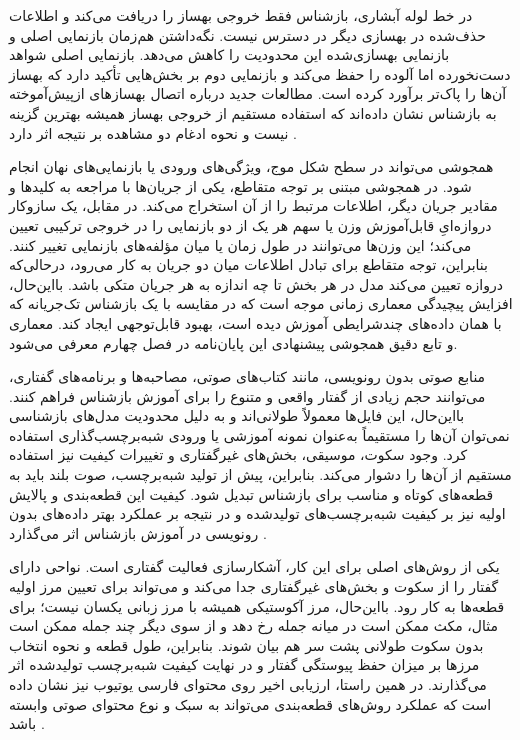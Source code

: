 
در خط لوله آبشاری، بازشناس فقط خروجی بهساز را دریافت می‌کند و اطلاعات حذف‌شده در بهسازی دیگر در دسترس نیست. نگه‌داشتن هم‌زمان بازنمایی اصلی و بازنمایی بهسازی‌شده این محدودیت را کاهش می‌دهد. بازنمایی اصلی شواهد دست‌نخورده اما آلوده را حفظ می‌کند و بازنمایی دوم بر بخش‌هایی تأکید دارد که بهساز آن‌ها را پاک‌تر برآورد کرده است. مطالعات جدید درباره اتصال بهسازهای ازپیش‌آموخته به بازشناس نشان داده‌اند که استفاده مستقیم از خروجی بهساز همیشه بهترین گزینه نیست و نحوه ادغام دو مشاهده بر نتیجه اثر دارد .

همجوشی می‌تواند در سطح شکل موج، ویژگی‌های ورودی یا بازنمایی‌های نهان انجام شود. در همجوشی مبتنی بر توجه متقاطع، یکی از جریان‌ها با مراجعه به کلیدها و مقادیر جریان دیگر، اطلاعات مرتبط را از آن استخراج می‌کند. در مقابل، یک سازوکار دروازه‌ایِ قابل‌آموزش وزن یا سهم هر یک از دو بازنمایی را در خروجی ترکیبی تعیین می‌کند؛ این وزن‌ها می‌توانند در طول زمان یا میان مؤلفه‌های بازنمایی تغییر کنند. بنابراین، توجه متقاطع برای تبادل اطلاعات میان دو جریان به کار می‌رود، درحالی‌که دروازه تعیین می‌کند مدل در هر بخش تا چه اندازه به هر جریان متکی باشد. بااین‌حال، افزایش پیچیدگی معماری زمانی موجه است که در مقایسه با یک بازشناس تک‌جریانه که با همان داده‌های چندشرایطی آموزش دیده است، بهبود قابل‌توجهی ایجاد کند. معماری و تابع دقیق همجوشی پیشنهادی این پایان‌نامه در فصل چهارم معرفی می‌شود.




منابع صوتی بدون رونویسی، مانند کتاب‌های صوتی، مصاحبه‌ها و برنامه‌های گفتاری، می‌توانند حجم زیادی از گفتار واقعی و متنوع را برای آموزش بازشناس فراهم کنند. بااین‌حال، این فایل‌ها معمولاً طولانی‌اند و به دلیل محدودیت مدل‌های بازشناسی نمی‌توان آن‌ها را مستقیماً به‌عنوان نمونه آموزشی یا ورودی شبه‌برچسب‌گذاری استفاده کرد. وجود سکوت، موسیقی، بخش‌های غیرگفتاری و تغییرات کیفیت نیز استفاده مستقیم از آن‌ها را دشوار می‌کند. بنابراین، پیش از تولید شبه‌برچسب، صوت بلند باید به قطعه‌های کوتاه و مناسب برای بازشناس تبدیل شود. کیفیت این قطعه‌بندی و پالایش اولیه نیز بر کیفیت شبه‌برچسب‌های تولیدشده و در نتیجه بر عملکرد بهتر داده‌های بدون رونویسی در آموزش بازشناس اثر می‌گذارد .

یکی از روش‌های اصلی برای این کار، آشکارسازی فعالیت گفتاری است.  نواحی دارای گفتار را از سکوت و بخش‌های غیرگفتاری جدا می‌کند و می‌تواند برای تعیین مرز اولیه قطعه‌ها به کار رود. بااین‌حال، مرز آکوستیکی همیشه با مرز زبانی یکسان نیست؛ برای مثال، مکث ممکن است در میانه جمله رخ دهد و از سوی دیگر چند جمله ممکن است بدون سکوت طولانی پشت سر هم بیان شوند. بنابراین، طول قطعه و نحوه انتخاب مرزها بر میزان حفظ پیوستگی گفتار و در نهایت کیفیت شبه‌برچسب تولیدشده اثر می‌گذارند. در همین راستا، ارزیابی اخیر روی محتوای فارسی یوتیوب نیز نشان داده است که عملکرد روش‌های قطعه‌بندی می‌تواند به سبک و نوع محتوای صوتی وابسته باشد .

